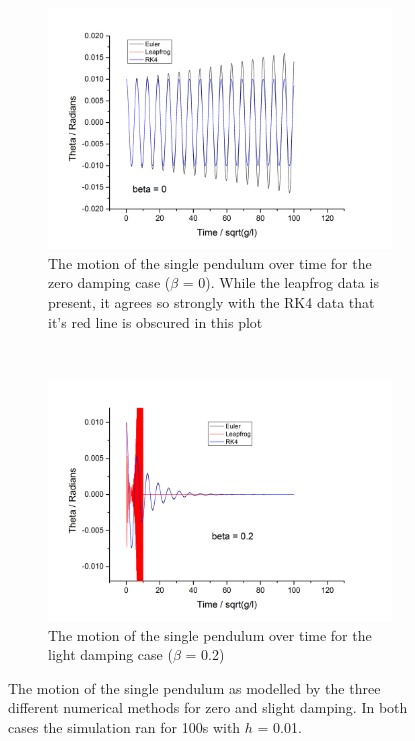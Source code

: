 \documentclass[11pt]{article}
\begin{document}
\begin{figure}[h!]
  \centering
  \begin{subfigure}[h]{0.5\textwidth}
    \includegraphics[width=\textwidth]{img/theta_vs_t_gamma=0.png}
    \captionsetup{width=0.85\textwidth}
    \caption{The motion of the single pendulum over time for the zero damping case ($\beta$ = 0). While the leapfrog data is present, it agrees so strongly with the RK4 data that it's red line is obscured in this plot}
    \label{fig:sp_beta0}
  \end{subfigure}%
  ~ %
  \begin{subfigure}[h]{0.5\textwidth}
    \includegraphics[width=\textwidth]{img/theta_vs_t_gamma=0-2.png}
    \captionsetup{width=0.85\textwidth}
    \caption{The motion of the single pendulum over time for the light damping case ($\beta$ = 0.2)}
    \label{fig:sp_beta0.2}
  \end{subfigure}
  \caption{The motion of the single pendulum as modelled by the three different numerical methods for zero and slight damping. In both cases the simulation ran for 100s with $h$ = 0.01.}
  \label{fig:sp_motion}
\end{figure}
\end{document}
